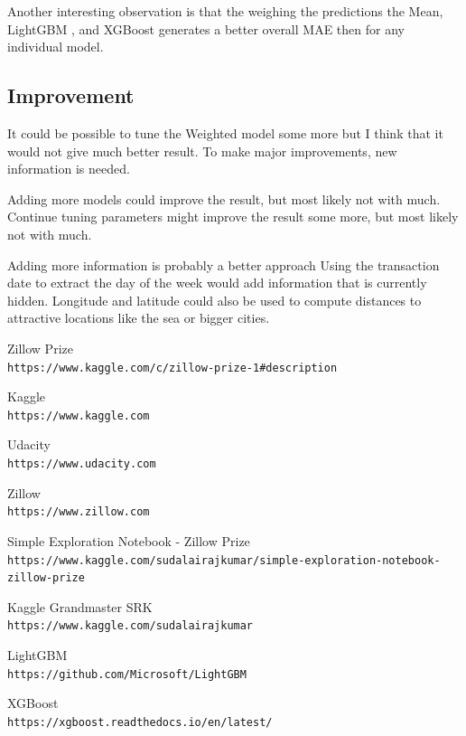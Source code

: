 \documentclass[a4paper]{article}
\begin{document}
Another interesting observation is that the weighing the predictions the Mean, LightGBM \cite{lightgbm}, and XGBoost \cite{xgboost} generates a better overall MAE then for any individual model.


\subsection{Improvement}
It could be possible to tune the Weighted model some more but I think that it would not give much better result. To make major improvements, new information is needed.

Adding more models could improve the result, but most likely not with much. Continue tuning parameters might improve the result some more, but most likely not with much.

Adding more information is probably a better approach Using the transaction date to extract the day of the week would add information that is currently hidden. Longitude and latitude could also be used to compute distances to attractive locations like the sea or bigger cities. 


\begin{thebibliography}{9}		

Zillow Prize
\\\texttt{https://www.kaggle.com/c/zillow-prize-1\#description}

Kaggle
\\\texttt{https://www.kaggle.com}

Udacity
\\\texttt{https://www.udacity.com}

Zillow
\\\texttt{https://www.zillow.com}

Simple Exploration Notebook - Zillow Prize
\\\texttt{https://www.kaggle.com/sudalairajkumar/simple-exploration-notebook-zillow-prize}

Kaggle Grandmaster SRK
\\\texttt{https://www.kaggle.com/sudalairajkumar}

LightGBM
\\\texttt{https://github.com/Microsoft/LightGBM}		

XGBoost
\\\texttt{https://xgboost.readthedocs.io/en/latest/}

\end{thebibliography}
\end{document}

